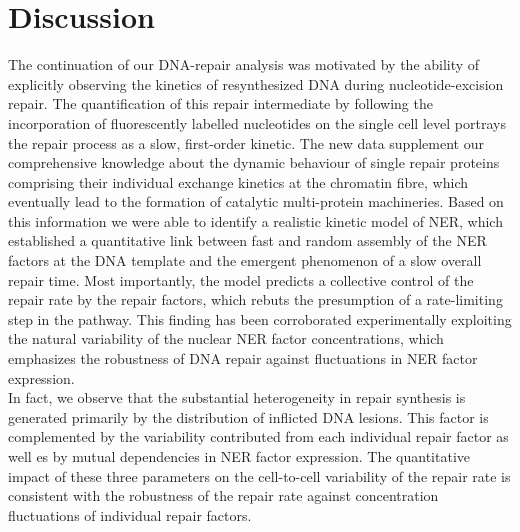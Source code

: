 \chapter{Discussion}


The continuation of our DNA-repair analysis was motivated by the ability of explicitly observing the kinetics of resynthesized DNA during nucleotide-excision repair. The quantification of this repair intermediate by following the incorporation of fluorescently labelled nucleotides on the single cell level portrays the repair process as a slow, first-order kinetic. The new data supplement our comprehensive knowledge about the dynamic behaviour of single repair proteins comprising their individual exchange kinetics at the chromatin fibre, which eventually lead to the formation of catalytic multi-protein machineries. Based on this information we were able to identify a realistic kinetic model of NER, which established a quantitative link between fast and random assembly of the NER factors at the DNA template and the emergent phenomenon of a slow overall repair time. Most importantly, the model predicts a collective control of the repair rate by the repair factors, which rebuts the presumption of a rate-limiting step in the pathway. This finding has been corroborated experimentally exploiting the natural variability of the nuclear NER factor concentrations, which emphasizes the robustness of DNA repair against fluctuations in NER factor expression.\\  
In fact, we observe that the substantial heterogeneity in repair synthesis is generated primarily by the distribution of inflicted DNA lesions. This factor is complemented by the variability contributed from each individual repair factor as well es by mutual dependencies in NER factor expression. The quantitative impact of these three parameters on the cell-to-cell variability of the repair rate is consistent with the robustness of the repair rate against concentration fluctuations of individual repair factors.


